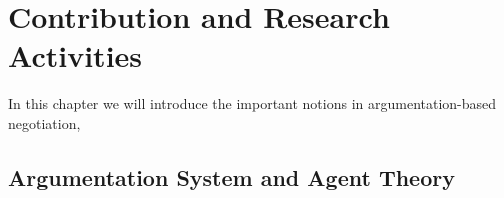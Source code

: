 \setcounter{chapter}{2}
\chapter{Contribution and Research Activities}

In this chapter we will introduce the important notions in argumentation-based negotiation,
\section{Argumentation System and Agent Theory}\label{sec:Argumentation}


